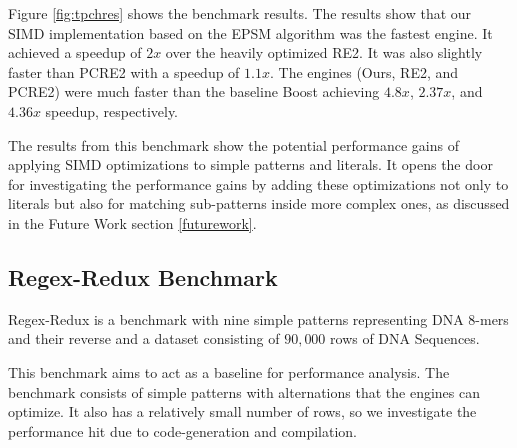 Figure \ref{fig:tpchres} shows the benchmark results. The results show that our SIMD implementation based on the EPSM algorithm was the fastest engine. It achieved a speedup of $2x$ over the heavily optimized RE2. It was also slightly faster than PCRE2 with a speedup of $1.1x$. The engines (Ours, RE2, and PCRE2) were much faster than the baseline Boost achieving $4.8x$, $2.37x$, and $4.36x$ speedup, respectively.

The results from this benchmark show the potential performance gains of applying SIMD optimizations to simple patterns and literals. It opens the door for investigating the performance gains by adding these optimizations not only to literals but also for matching sub-patterns inside more complex ones, as discussed in the Future Work section \ref{futurework}.

\subsection{Regex-Redux Benchmark}\label{regexredux}
Regex-Redux \cite{regexredux} is a benchmark with nine simple patterns representing DNA 8-mers and their reverse and a dataset consisting of $90,000$ rows of DNA Sequences.

This benchmark aims to act as a baseline for performance analysis. The benchmark consists of simple patterns with alternations that the engines can optimize. It also has a relatively small number of rows, so we investigate the performance hit due to code-generation and compilation.

